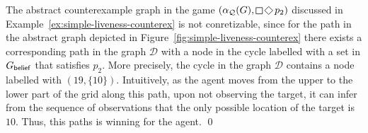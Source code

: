 
\begin{example}\label{ex:simple-liveness-unconcretizable}
The abstract counterexample graph in the game $(\alpha_\part(G),\LTLglobally \LTLfinally p_2)$ discussed in Example~\ref{ex:simple-liveness-counterex} is not conretizable, since for the path in the abstract graph depicted in Figure~\ref{fig:simple-liveness-counterex} there exists a corresponding path in the graph $\mathcal D$ with a node in the cycle labelled with a set in $G_{\mathsf{belief}}$ that satisfies $p_2$. More precisely, the cycle in the graph $\mathcal D$ contains a node labelled with $(19,\{10\})$. Intuitively, as the agent moves from the upper to the lower part of the grid along this path, upon not observing the target, it can infer from the sequence of observations that the only possible location of the target is $10$. Thus, this paths is winning for the agent.
\qed
\end{example}

